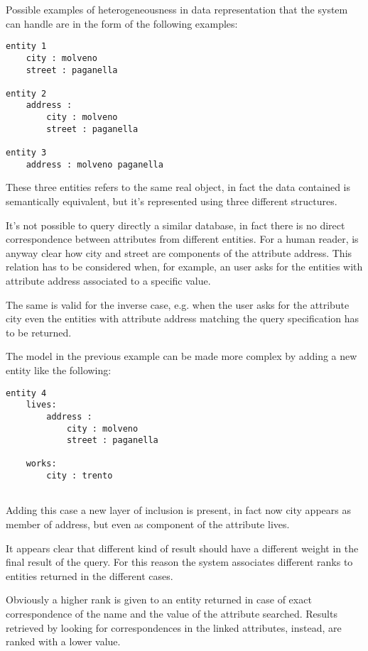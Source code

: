 \documentclass{acm_proc_article-sp-sigmod07}
\begin{document}
Possible examples of heterogeneousness in data representation that the
system can handle are in the form of the following examples:

\begin{verbatim}
entity 1
    city : molveno
    street : paganella

entity 2
    address :
        city : molveno
        street : paganella

entity 3
    address : molveno paganella 
\end{verbatim}

These three entities refers to the same real object, in fact the data
contained is semantically equivalent, but it's represented using three
different structures.

It's not possible to query directly a similar database, in fact there is
no direct correspondence between attributes from different entities.
For a human reader, is anyway clear how city and street are components of
the attribute address. This relation has to be considered when, for
example, an user asks for the entities with attribute address associated
to a specific value.

The same is valid for the inverse case, e.g. when the user asks for the
attribute city even the entities with attribute address matching the query
specification has to be returned.

The model in the previous example can be made more complex by adding a new
entity like the following:

\begin{verbatim}
entity 4
    lives:
        address :
            city : molveno
            street : paganella
    
    works:
        city : trento
         
\end{verbatim}

Adding this case a new layer of inclusion is present, in fact now city
appears as member of address, but even as component of the attribute
lives. 

It appears clear that different kind of result should have a different
weight in the final result of the query. For this reason the system
associates different ranks to entities returned in the different cases.

Obviously a higher rank is given to an entity returned in case of exact
correspondence of the name and the value of the attribute searched.
Results retrieved by looking for correspondences in the linked attributes,
instead, are ranked with a lower value.
\end{document}
